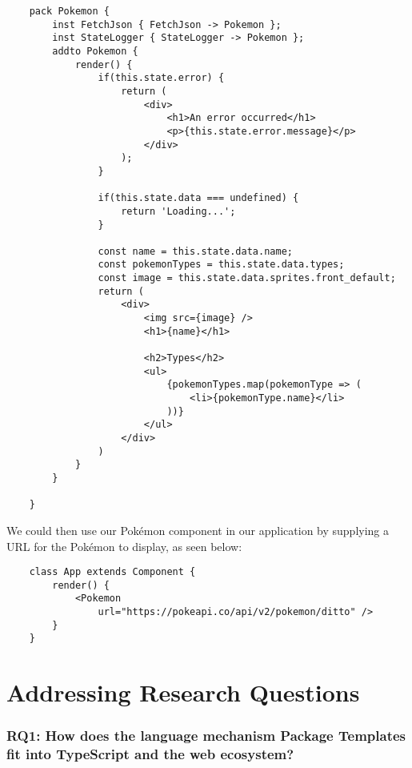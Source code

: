 \begin{verbatim}
    pack Pokemon {
        inst FetchJson { FetchJson -> Pokemon };
        inst StateLogger { StateLogger -> Pokemon };
        addto Pokemon {
            render() {
                if(this.state.error) {
                    return (
                        <div>
                            <h1>An error occurred</h1>
                            <p>{this.state.error.message}</p>
                        </div>
                    );
                }

                if(this.state.data === undefined) {
                    return 'Loading...';
                }

                const name = this.state.data.name;
                const pokemonTypes = this.state.data.types;
                const image = this.state.data.sprites.front_default;
                return (
                    <div>
                        <img src={image} />
                        <h1>{name}</h1>

                        <h2>Types</h2>
                        <ul>
                            {pokemonTypes.map(pokemonType => (
                                <li>{pokemonType.name}</li>
                            ))}
                        </ul>
                    </div>
                )
            }
        }

    }
\end{verbatim}

We could then use our Pokémon component in our application by supplying a URL for the Pokémon to display, as seen below:

\begin{verbatim}
    class App extends Component {
        render() {
            <Pokemon
                url="https://pokeapi.co/api/v2/pokemon/ditto" />
        }
    }
\end{verbatim}


\section{Addressing Research Questions}\label{sec:adressing-research-questions}


\subsubsection{RQ1: How does the language mechanism Package Templates fit into TypeScript and the web ecosystem?}



